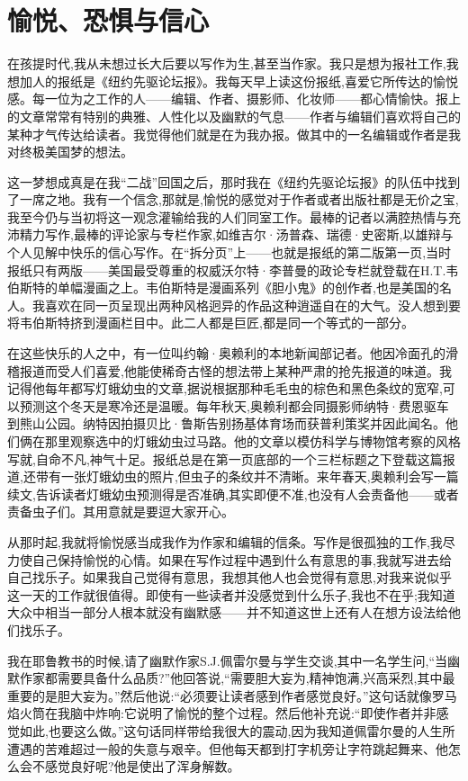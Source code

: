 \chapter{愉悦、恐惧与信心}
在孩提时代,我从未想过长大后要以写作为生,甚至当作家。我只是想为报社工作,我想加人的报纸是《纽约先驱论坛报》。我每天早上读这份报纸,喜爱它所传达的愉悦感。每一位为之工作的人——编辑、作者、摄影师、化妆师——都心情愉快。报上的文章常常有特别的典雅、人性化以及幽默的气息——作者与编辑们喜欢将自己的某种才气传达给读者。我觉得他们就是在为我办报。做其中的一名编辑或作者是我对终极美国梦的想法。


这一梦想成真是在我“二战”回国之后，那时我在《纽约先驱论坛报》的队伍中找到了一席之地。我有一个信念,那就是,愉悦的感觉对于作者或者出版社都是无价之宝,我至今仍与当初将这一观念灌输给我的人们同室工作。最棒的记者以满腔热情与充沛精力写作,最棒的评论家与专栏作家,如维吉尔·汤普森、瑞德·史密斯,以雄辩与个人见解中快乐的信心写作。在“拆分页”上——也就是报纸的第二版第一页,当时报纸只有两版——美国最受尊重的权威沃尔特·李普曼的政论专栏就登载在H.T.韦伯斯特的单幅漫画之上。韦伯斯特是漫画系列《胆小鬼》的创作者,也是美国的名人。我喜欢在同一页呈现出两种风格迥异的作品这种逍遥自在的大气。没人想到要将韦伯斯特挤到漫画栏目中。此二人都是巨匠,都是同一个等式的一部分。

在这些快乐的人之中，有一位叫约翰·奥赖利的本地新闻部记者。他因冷面孔的滑稽报道而受人们喜爱,他能使稀奇古怪的想法带上某种严肃的抢先报道的味道。我记得他每年都写灯蛾幼虫的文章,据说根据那种毛毛虫的棕色和黑色条纹的宽窄,可以预测这个冬天是寒冷还是温暖。每年秋天,奥赖利都会同摄影师纳特·费恩驱车到熊山公园。纳特因拍摄贝比·鲁斯告别扬基体育场而获普利策奖并因此闻名。他们俩在那里观察选中的灯蛾幼虫过马路。他的文章以模仿科学与博物馆考察的风格写就,自命不凡,神气十足。报纸总是在第一页底部的一个三栏标题之下登载这篇报道,还带有一张灯蛾幼虫的照片,但虫子的条纹并不清晰。来年春天,奥赖利会写一篇续文,告诉读者灯蛾幼虫预测得是否准确,其实即便不准,也没有人会责备他——或者责备虫子们。其用意就是要逗大家开心。

从那时起,我就将愉悦感当成我作为作家和编辑的信条。写作是很孤独的工作,我尽力使自己保持愉悦的心情。如果在写作过程中遇到什么有意思的事,我就写进去给自己找乐子。如果我自己觉得有意思，我想其他人也会觉得有意思,对我来说似乎这一天的工作就很值得。即使有一些读者并没感觉到什么乐子,我也不在乎;我知道大众中相当一部分人根本就没有幽默感——并不知道这世上还有人在想方设法给他们找乐子。

我在耶鲁教书的时候,请了幽默作家S.J.佩雷尔曼与学生交谈,其中一名学生问,“当幽默作家都需要具备什么品质?”他回答说,“需要胆大妄为,精神饱满,兴高采烈,其中最重要的是胆大妄为。”然后他说:“必须要让读者感到作者感觉良好。”这句话就像罗马焰火筒在我脑中炸响:它说明了愉悦的整个过程。然后他补充说:“即使作者并非感觉如此,也要这么做。”这句话同样带给我很大的震动,因为我知道佩雷尔曼的人生所遭遇的苦难超过一般的失意与艰辛。但他每天都到打字机旁让字符跳起舞来、他怎么会不感觉良好呢?他是使出了浑身解数。

